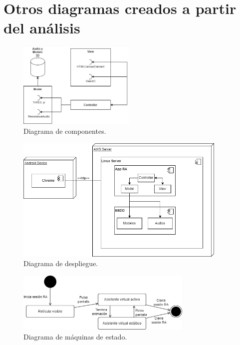 \documentclass{subfiles}
\begin{document}
        \section{Otros diagramas creados a partir del análisis}
        \label{sec:otros_diagramas_creados_a_partir_del_analisis}

\begin{figure}[ht]
\centering
\includegraphics[width=0.50\textwidth]{img/analisis_diagrama_de_componentes.png}
\caption{Diagrama de componentes.}
\label{fig:analisis_diagrama_de_componentes}
\end{figure}

\begin{figure}[ht]
\centering
\includegraphics[width=0.9\textwidth]{img/analisis_diagrama_de_despliegue.png}
\caption{Diagrama de despliegue.}
\label{fig:analisis_diagrama_de_despliegue}
\end{figure}

\begin{figure}[ht]
\centering
\includegraphics[width=0.75\textwidth]{img/analisis_diagrama_maquinas_de_estado.png}
\caption{Diagrama de máquinas de estado.}
\label{fig:analisis_diagrama_maquinas_de_estado}
\end{figure}
\end{document}
